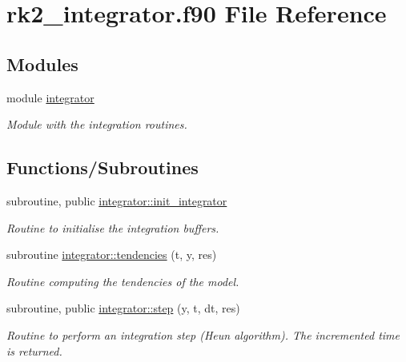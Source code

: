 \hypertarget{rk2__integrator_8f90}{}\section{rk2\+\_\+integrator.\+f90 File Reference}
\label{rk2__integrator_8f90}
\subsection*{Modules}
\begin{DoxyCompactItemize}
\item 
module \hyperlink{namespaceintegrator}{integrator}
\begin{DoxyCompactList}\small\item\em Module with the integration routines. \end{DoxyCompactList}\end{DoxyCompactItemize}
\subsection*{Functions/\+Subroutines}
\begin{DoxyCompactItemize}
\item 
subroutine, public \hyperlink{namespaceintegrator_ab01b1930fc627150051ed5c5465ac533}{integrator\+::init\+\_\+integrator}
\begin{DoxyCompactList}\small\item\em Routine to initialise the integration buffers. \end{DoxyCompactList}\item 
subroutine \hyperlink{namespaceintegrator_ae8158ec5bb2be4dca1daadb1a906ba96}{integrator\+::tendencies} (t, y, res)
\begin{DoxyCompactList}\small\item\em Routine computing the tendencies of the model. \end{DoxyCompactList}\item 
subroutine, public \hyperlink{namespaceintegrator_adaf5baacd0ff1905f334ce824cdcd58e}{integrator\+::step} (y, t, dt, res)
\begin{DoxyCompactList}\small\item\em Routine to perform an integration step (Heun algorithm). The incremented time is returned. \end{DoxyCompactList}\end{DoxyCompactItemize}
